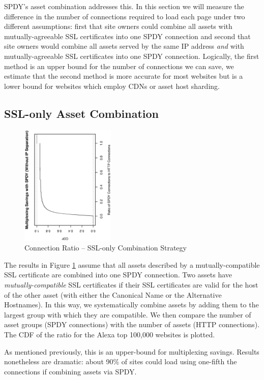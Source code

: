 \documentclass[11pt,letterpaper,notitlepage]{article}
\begin{document}
SPDY's asset combination addresses this. In this section we will measure the
difference in the number of connections required to load each page under two
different assumptions: first that site owners could combine all assets with
mutually-agreeable SSL certificates into one SPDY connection and second that
site owners would combine all assets served by the same IP address \textit{and}
with mutually-agreeable SSL certificates into one SPDY connection. Logically,
the first method is an upper bound for the number of connections we can save,
we estimate that the second method is more accurate for most websites but is a
lower bound for websites which employ CDNs or asset host sharding.

\subsection{SSL-only Asset Combination}
\begin{figure}[h!]
\centering
\includegraphics[width=0.4\textwidth,angle=270]{plots/asset_combination_only_ssl_ratio.eps}
\caption{Connection Ratio -- SSL-only Combination Strategy}
\label{fig:combination-ssl}
\end{figure}
The results in Figure \ref{fig:combination-ssl} assume that all assets
described by a mutually-compatible SSL certificate are combined into one SPDY
connection. Two assets have \textit{mutually-compatible} SSL certificates if
their SSL certificates are valid for the host of the other asset (with either
the Canonical Name or the Alternative Hostnames). In this way, we
systematically combine assets by adding them to the largest group with which
they are compatible. We then compare the number of asset groups (SPDY
connections) with the number of assets (HTTP connections). The CDF of the ratio
for the Alexa top 100,000 websites is plotted.

As mentioned previously, this is an upper-bound for multiplexing savings.
Results nonetheless are dramatic: about 90\% of sites could load using
one-fifth the connections if combining assets via SPDY.
\end{document}
